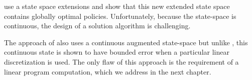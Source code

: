 \citet{bauerle2011markov} use a state space extensions and show that this new extended state space contains globally optimal policies. Unfortunately, because the state-space is continuous, the design of a solution algorithm is challenging.

The approach of \citet{chow2015risk} also uses a continuous augmented state-space but unlike \citet{bauerle2011markov}, this continuous state is shown to have bounded error when a particular linear discretization is used. The only flaw of this approach is the requirement of a linear program computation, which we address in the next chapter.


